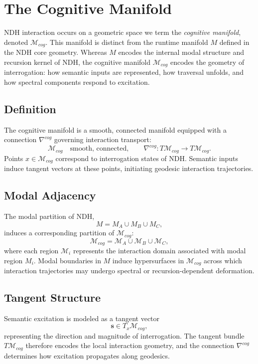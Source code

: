 \section{The Cognitive Manifold}
\label{sec:cognitive-manifold}

NDH interaction occurs on a geometric space we term the \emph{cognitive
manifold}, denoted $\mathcal{M}_{cog}$. This manifold is distinct from the
runtime manifold $M$ defined in the NDH core geometry. Whereas $M$ encodes the
internal modal structure and recursion kernel of NDH, the cognitive manifold
$\mathcal{M}_{cog}$ encodes the geometry of interrogation: how semantic inputs
are represented, how traversal unfolds, and how spectral components respond to
excitation.

\subsection{Definition}

The cognitive manifold is a smooth, connected manifold equipped with a
connection $\nabla^{cog}$ governing interaction transport:
\[
\mathcal{M}_{cog} \quad \text{smooth, connected}, \qquad
\nabla^{cog} : T\mathcal{M}_{cog} \to T\mathcal{M}_{cog}.
\]
Points $x \in \mathcal{M}_{cog}$ correspond to interrogation states of NDH.
Semantic inputs induce tangent vectors at these points, initiating geodesic
interaction trajectories.

\subsection{Modal Adjacency}

The modal partition of NDH,
\[
M = M_A \cup M_B \cup M_C,
\]
induces a corresponding partition of $\mathcal{M}_{cog}$:
\[
\mathcal{M}_{cog} = \mathcal{M}_A \cup \mathcal{M}_B \cup \mathcal{M}_C,
\]
where each region $\mathcal{M}_i$ represents the interaction domain associated
with modal region $M_i$. Modal boundaries in $M$ induce hypersurfaces in
$\mathcal{M}_{cog}$ across which interaction trajectories may undergo spectral
or recursion-dependent deformation.

\subsection{Tangent Structure}

Semantic excitation is modeled as a tangent vector
\[
\mathbf{s} \in T_x \mathcal{M}_{cog},
\]
representing the direction and magnitude of interrogation. The tangent bundle
$T\mathcal{M}_{cog}$ therefore encodes the local interaction geometry, and the
connection $\nabla^{cog}$ determines how excitation propagates along geodesics.

